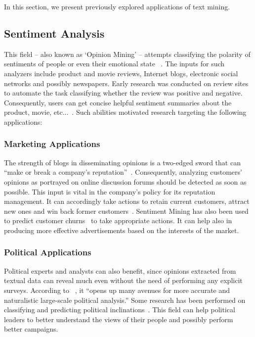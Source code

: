 \documentclass[a4,12pt]{report}
\begin{document}
In this section, we present previously explored applications of text mining. %

\subsection{Sentiment Analysis} 
	This field -- also known as `Opinion Mining' -- attempts classifying the polarity of sentiments of people 
	or even their emotional state ~\cite{Pang:08}. The inputs for such analyzers include product and movie reviews, 
	Internet blogs, electronic social networks and possibly newspapers. Early research was conducted on review sites
	to automate the task classifying whether the review was positive and negative. Consequently, users can get concise helpful
	sentiment summaries about the product, movie, etc...~\cite{Pang:02, Turney:02}. Such abilities motivated research targeting 
	the following applications:
	\subsubsection{Marketing Applications} 
		The strength of blogs in disseminating opinions is a two-edged sword that can 
		``make or break a company's reputation''~\cite{hoffman:08a}. Consequently, analyzing customers' opinions as portrayed 
		on online discussion forums should be detected as soon as possible. This input is vital in the company's policy for its
		reputation management. It can accordingly take actions to retain current customers, attract new ones and win back former 
		customers~\cite{hoffman:08b}. Sentiment Mining has also been used to predict customer churns~\cite{marketing:07,marketing:08}%
		to take appropriate actions. It can help also in producing more effective advertisements based on the interests of the market.
	\subsubsection{Political Applications} 
		Political experts and analysts can also benefit, since opinions extracted from textual data 
		can reveal much even without the need of performing any explicit surveys. According to ~\cite{Gryc:10}, it ``opens up many avenues
		for more accurate and naturalistic large-scale political analysis.'' Some research has been performed on classifying and predicting
		political inclinations~\cite{Durant:07, Yu:08}. This field can help political leaders to better understand the views of their people 
		and possibly perform better campaigns.
		
\end{document}
